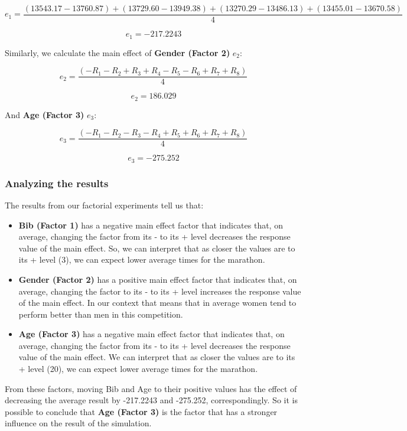 \documentclass[11pt, oneside]{article}   	%
\begin{document}
$$e_1 = \dfrac{(13543.17 - 13760.87) + (13729.60 - 13949.38) + (13270.29 - 13486.13) + (13455.01 - 13670.58)}{4}$$

$$e_1 = -217.2243$$

Similarly, we calculate the main effect of \textbf{Gender (Factor 2)}  $e_2$:

$$e_2 = \dfrac{(-R_1 - R_2 + R_3 + R_4 - R_5 - R_6 + R_7 + R_8)}{4}$$

$$e_2 = 186.029$$

And \textbf{Age (Factor 3)} $e_3$:

$$e_3 = \dfrac{(-R_1 - R_2 - R_3 - R_4 + R_5 + R_6 + R_7 + R_8)}{4}$$

$$e_3 = -275.252$$

\subsubsection{Analyzing the results}

The results from our factorial experiments tell us that:

\begin{itemize}
\item \textbf{Bib (Factor 1)} has a negative main effect factor that indicates that, on average, changing the factor from its - to its + level decreases the response value of the main effect. So, we can interpret that as closer the values are to its + level (3), we can expect lower average times for the marathon.
\item \textbf{Gender (Factor 2)} has a positive main effect factor that indicates that, on average, changing the factor to its - to its + level increases the response value of the main effect. In our context that means that in average women tend to perform better than men in this competition.
\item \textbf{Age (Factor 3)} has a negative main effect factor that indicates that, on average, changing the factor from its - to its + level decreases the response value of the main effect. We can interpret that as closer the values are to its + level (20), we can expect lower average times for the marathon.
\end{itemize}

From these factors, moving Bib and Age to their positive values has the effect of decreasing the average result by -217.2243 and -275.252, correspondingly. So it is possible to conclude that \textbf{Age (Factor 3)} is the factor that has a stronger influence on the result of the simulation.
\end{document}
